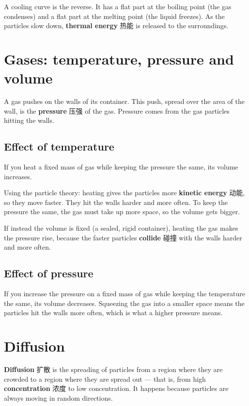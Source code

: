 \documentclass[11pt]{article}
\begin{document}
A cooling curve is the reverse. It has a flat part at the boiling point (the gas condenses) and a flat part at the melting point (the liquid freezes). As the particles slow down, \textbf{thermal energy} 热能 is released to the surroundings.

\section*{Gases: temperature, pressure and volume}

A gas pushes on the walls of its container. This push, spread over the area of the wall, is the \textbf{pressure} 压强 of the gas. Pressure comes from the gas particles hitting the walls.

\subsection*{Effect of temperature}

If you heat a fixed mass of gas while keeping the pressure the same, its volume increases.

Using the particle theory: heating gives the particles more \textbf{kinetic energy} 动能, so they move faster. They hit the walls harder and more often. To keep the pressure the same, the gas must take up more space, so the volume gets bigger.

If instead the volume is fixed (a sealed, rigid container), heating the gas makes the pressure rise, because the faster particles \textbf{collide} 碰撞 with the walls harder and more often.

\subsection*{Effect of pressure}

If you increase the pressure on a fixed mass of gas while keeping the temperature the same, its volume decreases. Squeezing the gas into a smaller space means the particles hit the walls more often, which is what a higher pressure means.

\section*{Diffusion}

\textbf{Diffusion} 扩散 is the spreading of particles from a region where they are crowded to a region where they are spread out — that is, from high \textbf{concentration} 浓度 to low concentration. It happens because particles are always moving in random directions.
\end{document}
